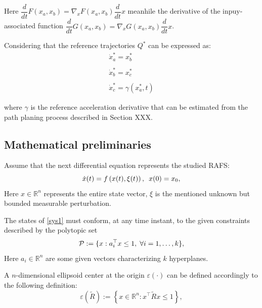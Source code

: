 \documentclass[journal,twocolumn]{IEEEtran}
\begin{document}
Here $\dfrac{d}{dt} F \left( x_{a},x_{b}\right) = \nabla_{x} F \left( x_{a},x_{b}\right) \dfrac{d}{dt}x$ meanhile the derivative of the inpuy-associated function $\dfrac{d}{dt} G \left( x_{a},x_{b}\right) = \nabla_{x} G \left( x_{a},x_{b}\right) \dfrac{d}{dt}x$.

Considering that the reference trajectories $Q^{*}$ can be expressed as:
%
\begin{equation}
\begin{array}{c}
\dot{x}^{*}_{a}=x^{*}_{b} \\ 
\\
\dot{x}^{*}_{b}=x^{*}_{c} \\ 
\\
\dot{x}^{*}_{c}= \gamma \left( {x}^{*}_{a},t\right) 
\end{array}%
\end{equation}

\noindent where $\gamma$ is the reference acceleration derivative that can be estimated from the path planing process described in Section XXX.

\subsection{Mathematical preliminaries}

Assume that the next differential equation represents the studied RAFS:
%
\begin{equation}\label{sys1}
 \dot{x}(t) = f\left(x(t), \xi(t) \right), \enskip x(0) = x_0,
\end{equation}
%
Here $x \in \mathbb{R}^n$ represents the entire state vector, $\xi$ is the mentioned unknown but bounded measurable perturbation. 






The states of \eqref{sys1} must conform, at any time instant, to the given constraints described by the polytopic set   
%
\begin{equation}\label{poly}
 {\cal P}:=\{x:  a_i^{\top}x \leq 1,\; \forall i=1,\dots,k\},
\end{equation}
%
Here $a_i\in \mathbb{R}^n$ are some given vectors characterizing $k$ hyperplanes. 

A $n$-dimensional ellipsoid center at the origin $\varepsilon(\cdot)$ can be defined accordingly to the following definition: 
%
 \begin{equation}\label{eli}
  \varepsilon (\tilde{R}):= \left\lbrace x \in \mathbb{R}^n: x^{\top} \tilde{R} x \leq 1 \right\rbrace,
 \end{equation}
 
\end{document}
